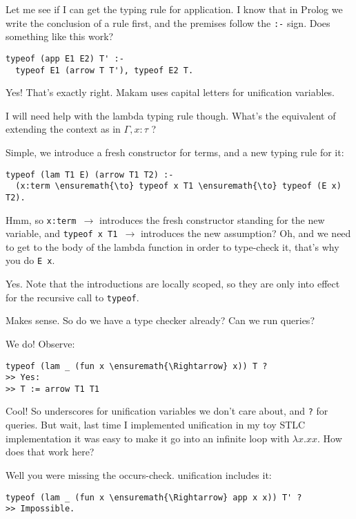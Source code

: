  Let me see if I can get the typing rule for application. I know
that in Prolog we write the conclusion of a rule first, and the premises
follow the \texttt{:-} sign. Does something like this work?

\begin{verbatim}
typeof (app E1 E2) T' :-
  typeof E1 (arrow T T'), typeof E2 T.
\end{verbatim}

 Yes! That's exactly right. Makam uses capital letters for
unification variables.

 I will need help with the lambda typing rule though. What's the
equivalent of extending the context as in \(\Gamma, x : \tau\) ?

 Simple, we introduce a fresh constructor for terms, and a new
typing rule for it:

\begin{verbatim}
typeof (lam T1 E) (arrow T1 T2) :-
  (x:term \ensuremath{\to} typeof x T1 \ensuremath{\to} typeof (E x) T2).
\end{verbatim}

 Hmm, so \texttt{x:term\ \ensuremath{\to}} introduces the fresh
constructor standing for the new variable, and
\texttt{typeof\ x\ T1\ \ensuremath{\to}} introduces the new assumption?
Oh, and we need to get to the body of the lambda function in order to
type-check it, that's why you do \texttt{E\ x}.

 Yes. Note that the introductions are locally scoped, so they are
only into effect for the recursive call to \texttt{typeof}.

 Makes sense. So do we have a type checker already? Can we run
queries?

 We do! Observe:

\begin{verbatim}
typeof (lam _ (fun x \ensuremath{\Rightarrow} x)) T ?
>> Yes:
>> T := arrow T1 T1
\end{verbatim}

 Cool! So underscores for unification variables we don't care
about, and \texttt{?} for queries. But wait, last time I implemented
unification in my toy STLC implementation it was easy to make it go into
an infinite loop with \(\lambda x. x x\). How does that work here?

 Well you were missing the occurs-check. \lamprolog unification
includes it:

\begin{verbatim}
typeof (lam _ (fun x \ensuremath{\Rightarrow} app x x)) T' ?
>> Impossible.
\end{verbatim}

